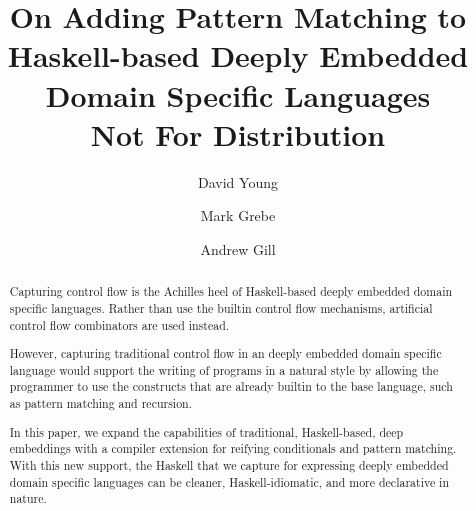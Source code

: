 \documentclass[sigplan,anonymous,review]{acmart}
\begin{document}
\title{On Adding Pattern Matching to Haskell-based
  Deeply Embedded Domain Specific Languages\\
\large{Not For Distribution}}

\author{David Young}


\author{Mark Grebe}

\author{Andrew Gill}

\renewcommand{\shortauthors}{Young, Grebe and Gill}

\begin{abstract}
  Capturing control flow is the Achilles heel of Haskell-based
  deeply embedded domain specific languages.
  Rather than use
  the builtin control flow mechanisms, artificial control flow combinators
  are used instead.

  However, capturing traditional control flow in an deeply embedded domain specific language
  would support the writing of programs in a natural style by allowing the programmer to use the
  constructs that are already builtin to the base language, such as pattern
  matching and recursion.

  In this paper, we expand the capabilities of traditional,
  Haskell-based, deep embeddings with a compiler extension
  for reifying conditionals and pattern matching.
  With this new support, the Haskell that we capture for expressing
  deeply embedded domain specific languages can be cleaner, Haskell-idiomatic,
  and more declarative in nature.

\end{abstract}
\end{document}

